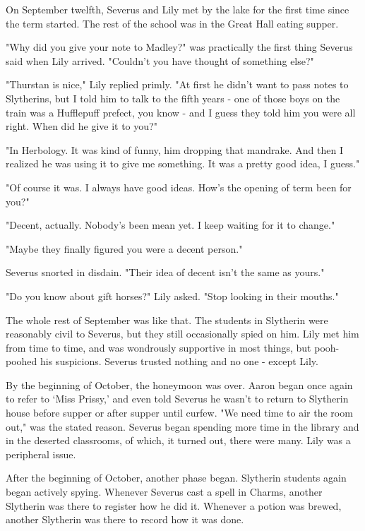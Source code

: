 \documentclass[a4paper,11pt]{article}
\begin{document}
On September twelfth, Severus and Lily met by the lake for the first time since the term started. The rest of the school was in the Great Hall eating supper.

"Why did you give your note to Madley?" was practically the first thing Severus said when Lily arrived. "Couldn't you have thought of something else?"

"Thurstan is nice," Lily replied primly. "At first he didn't want to pass notes to Slytherins, but I told him to talk to the fifth years - one of those boys on the train was a Hufflepuff prefect, you know - and I guess they told him you were all right. When did he give it to you?"

"In Herbology. It was kind of funny, him dropping that mandrake. And then I realized he was using it to give me something. It was a pretty good idea, I guess."

"Of course it was. I always have good ideas. How's the opening of term been for you?"

"Decent, actually. Nobody's been mean yet. I keep waiting for it to change."

"Maybe they finally figured you were a decent person."

Severus snorted in disdain. "Their idea of decent isn't the same as yours."

"Do you know about gift horses?" Lily asked. "Stop looking in their mouths."

The whole rest of September was like that. The students in Slytherin were reasonably civil to Severus, but they still occasionally spied on him. Lily met him from time to time, and was wondrously supportive in most things, but pooh-poohed his suspicions. Severus trusted nothing and no one - except Lily.

By the beginning of October, the honeymoon was over. Aaron began once again to refer to `Miss Prissy,' and even told Severus he wasn't to return to Slytherin house before supper or after supper until curfew. "We need time to air the room out," was the stated reason. Severus began spending more time in the library and in the deserted classrooms, of which, it turned out, there were many. Lily was a peripheral issue.

After the beginning of October, another phase began. Slytherin students again began actively spying. Whenever Severus cast a spell in Charms, another Slytherin was there to register how he did it. Whenever a potion was brewed, another Slytherin was there to record how it was done.
\end{document}
